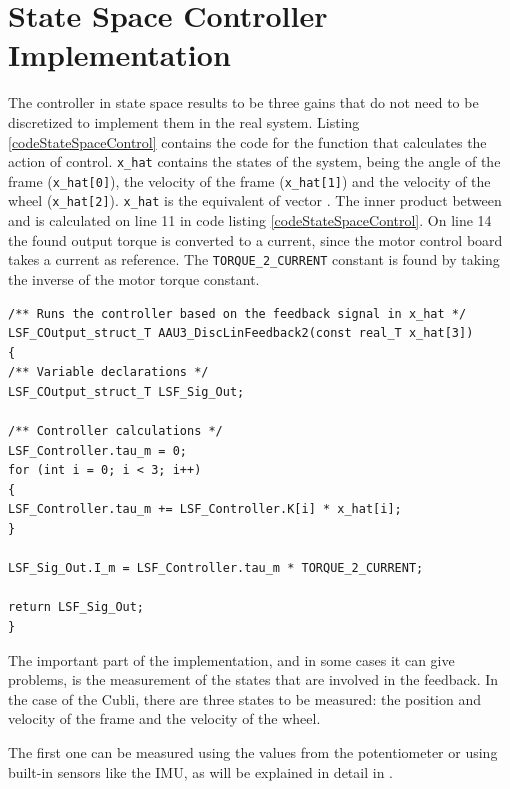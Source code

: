 \section{State Space Controller Implementation}\label{sec:SSImplementation}
The controller in state space results to be three gains that do not need to be discretized to implement them in the real system. Listing \ref{codeStateSpaceControl} contains the code for the function that calculates the action of control.
\lstinline[style=customcppinline]{x_hat} contains the states of the system, being the angle of the frame (\lstinline[style=customcppinline]{x_hat[0]}), the velocity of the frame (\lstinline[style=customcppinline]{x_hat[1]}) and the velocity of the wheel (\lstinline[style=customcppinline]{x_hat[2]}). \lstinline[style=customcppinline]{x_hat} is the equivalent of vector \si{}. The inner product between \si{} and \si{} is calculated on line 11 in code listing \ref{codeStateSpaceControl}. On line 14 the found output torque is converted to a current, since the motor control board takes a current as reference. The \lstinline[style=customcppinline]{TORQUE_2_CURRENT} constant is found by taking the inverse of the motor torque constant.
\begin{lstlisting}[style = customcpp,
                  caption  = {Code for the implementation of the State Space Controller. The feedback from the Cubli is contained in the array x\_hat.},
                  label    = codeStateSpaceControl ]
/** Runs the controller based on the feedback signal in x_hat */
LSF_COutput_struct_T AAU3_DiscLinFeedback2(const real_T x_hat[3])
{
/** Variable declarations */
LSF_COutput_struct_T LSF_Sig_Out;

/** Controller calculations */
LSF_Controller.tau_m = 0;
for (int i = 0; i < 3; i++)
{
LSF_Controller.tau_m += LSF_Controller.K[i] * x_hat[i];
}

LSF_Sig_Out.I_m = LSF_Controller.tau_m * TORQUE_2_CURRENT;

return LSF_Sig_Out;
}
\end{lstlisting}
The important part of the implementation, and in some cases it can give problems, is the measurement of the states that are involved in the feedback.
In the case of the Cubli, there are three states to be measured: the position and velocity of the frame and the velocity of the wheel.

The first one can be measured using the values from the potentiometer or using built-in sensors like the IMU, as will be explained in detail in .

